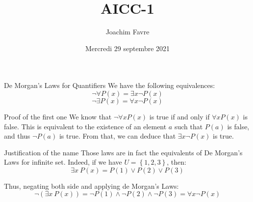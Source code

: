 \documentclass{article}
\title{AICC-1}
\author{Joachim Favre}
\date{Mercredi 29 septembre 2021}
\begin{document}
\maketitle


\begin{parag}{De Morgan's Laws for Quantifiers}
    We have the following equivalences: 
    \[\lnot \forall P\left(x\right) = \exists x \lnot P\left(x\right)\]
    \[\lnot \exists P\left(x\right) = \forall x \lnot P\left(x\right)\]
    
    \begin{subparag}{Proof of the first one}
        We know that $\lnot \forall x P\left(x\right)$ is true if and only if $\forall x P\left(x\right)$ is false. This is equivalent to the existence of an element $a$ such that $P\left(a\right)$ is false, and thus $\lnot P\left(a\right)$ is true. From that, we can deduce that $\exists x \lnot P\left(x\right)$ is true.
    \end{subparag}
    
    \begin{subparag}{Justification of the name}
        Those laws are in fact the equivalents of De Morgan's Laws for infinite set. Indeed, if we have $U = \left\{1, 2, 3\right\}$, then: 
        \[\exists x\ P\left(x\right) = P\left(1\right) \lor P\left(2\right) \lor P\left(3\right) \]

        Thus, negating both side and applying de Morgan's Laws: 
        \[\lnot \left(\exists x\ P\left(x\right)\right) = \lnot P\left(1\right) \land \lnot P\left(2\right) \land \lnot P\left(3\right) = \forall x \lnot P\left(x\right)\]
    \end{subparag}
    
\end{parag}
\end{document}
